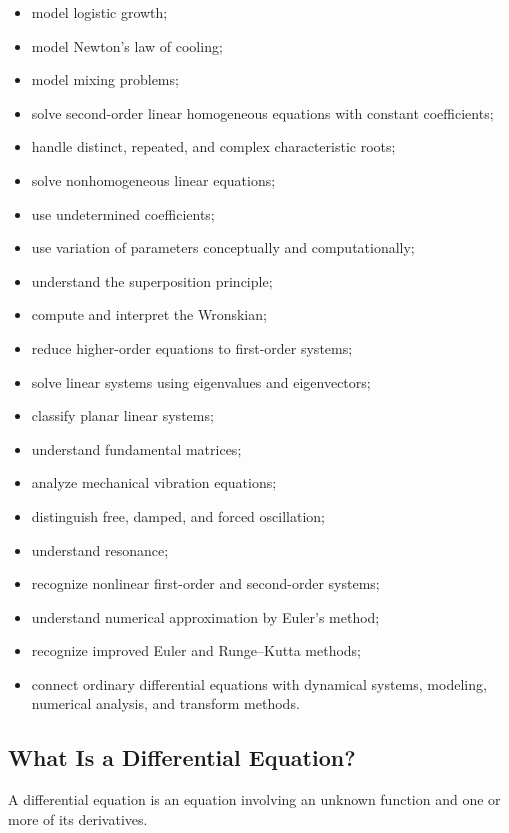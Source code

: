 {\begin{itemize}
    \item model logistic growth;
    \item model Newton's law of cooling;
    \item model mixing problems;
    \item solve second-order linear homogeneous equations with constant
          coefficients;
    \item handle distinct, repeated, and complex characteristic roots;
    \item solve nonhomogeneous linear equations;
    \item use undetermined coefficients;
    \item use variation of parameters conceptually and computationally;
    \item understand the superposition principle;
    \item compute and interpret the Wronskian;
    \item reduce higher-order equations to first-order systems;
    \item solve linear systems using eigenvalues and eigenvectors;
    \item classify planar linear systems;
    \item understand fundamental matrices;
    \item analyze mechanical vibration equations;
    \item distinguish free, damped, and forced oscillation;
    \item understand resonance;
    \item recognize nonlinear first-order and second-order systems;
    \item understand numerical approximation by Euler's method;
    \item recognize improved Euler and Runge--Kutta methods;
    \item connect ordinary differential equations with dynamical systems,
          modeling, numerical analysis, and transform methods.
\end{itemize}
}

\subsection{What Is a Differential Equation?}
\label{subsec:what-is-differential-equation}

A differential equation is an equation involving an unknown function and
one or more of its derivatives.

